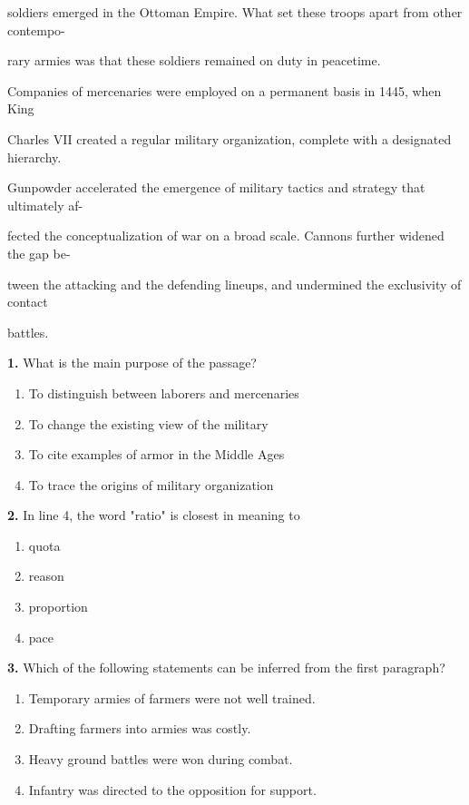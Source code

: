 \documentclass[12pt]{article}
\begin{document}
soldiers emerged in the Ottoman Empire. What set these troops apart from other contempo-\par
rary armies was that these soldiers remained on duty in peacetime.\par
Companies of mercenaries were employed on a permanent basis in 1445, when King\par
Charles VII created a regular military organization, complete with a designated hierarchy.\par
Gunpowder accelerated the emergence of military tactics and strategy that ultimately af-\par
fected the conceptualization of war on a broad scale. Cannons further widened the gap be-\par
tween the attacking and the defending lineups, and undermined the exclusivity of contact\par
battles.\par
\endgroup
\medskip
\noindent\textbf{1.} What is the main purpose of the passage?
\begin{enumerate}[label=(\Alph*),leftmargin=*,itemsep=0.2em]
\item To distinguish between laborers and mercenaries
\item To change the existing view of the military
\item To cite examples of armor in the Middle Ages
\item To trace the origins of military organization
\end{enumerate}
\par
\vspace{0.25\baselineskip}
\noindent\textbf{2.} In line 4, the word "ratio" is closest in meaning to
\begin{enumerate}[label=(\Alph*),leftmargin=*,itemsep=0.2em]
\item quota
\item reason
\item proportion
\item pace
\end{enumerate}
\par
\vspace{0.25\baselineskip}
\noindent\textbf{3.} Which of the following statements can be inferred from the first paragraph?
\begin{enumerate}[label=(\Alph*),leftmargin=*,itemsep=0.2em]
\item Temporary armies of farmers were not well trained.
\item Drafting farmers into armies was costly.
\item Heavy ground battles were won during combat.
\item Infantry was directed to the opposition for support.
\end{enumerate}
\end{document}
